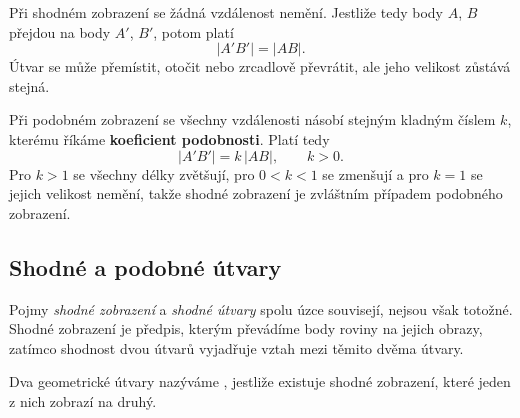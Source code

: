 \documentclass[12pt,a4paper]{article}
\begin{document}
Při shodném zobrazení se žádná vzdálenost nemění. Jestliže tedy body $A$, $B$ přejdou na body $A'$, $B'$, potom platí
\[
    |A'B'|=|AB|.
\]
Útvar se může přemístit, otočit nebo zrcadlově převrátit, ale jeho velikost zůstává stejná.

Při podobném zobrazení se všechny vzdálenosti násobí stejným kladným číslem $k$, kterému říkáme \textbf{koeficient podobnosti}. Platí tedy
\[
    |A'B'|=k\,|AB|,
    \qquad k>0.
\]
Pro $k>1$ se všechny délky zvětšují, pro $0<k<1$ se zmenšují a pro $k=1$ se jejich velikost nemění, takže shodné zobrazení je zvláštním případem podobného zobrazení.

\begin{center}
\end{center}

\subsection{Shodné a podobné útvary}

Pojmy \emph{shodné zobrazení} a \emph{shodné útvary} spolu úzce souvisejí, nejsou však totožné. Shodné zobrazení je předpis, kterým převádíme body roviny na jejich obrazy, zatímco shodnost dvou útvarů vyjadřuje vztah mezi těmito dvěma útvary.

\begin{definitionbox}
    Dva geometrické útvary nazýváme , jestliže existuje shodné zobrazení, které jeden z nich zobrazí na druhý.
\end{definitionbox}
\end{document}

